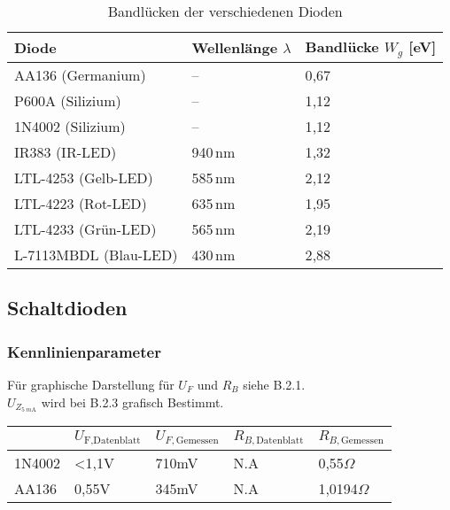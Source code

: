 \documentclass[
	a4paper, %
	12pt, %
]{CSUniSchoolLabReport}
\newcommand{\milli}{m}
\begin{document}
\begin{table}[h]
\centering
\begin{tabular}{lll}
\toprule
\textbf{Diode} & \textbf{Wellenlänge \(\lambda\)} & \textbf{Bandlücke \(W_g\) [eV]} \\
\midrule
AA136 (Germanium)     & --              & 0{,}67 \\
P600A (Silizium)      & --              & 1{,}12 \\
1N4002 (Silizium)     & --              & 1{,}12 \\
IR383 (IR-LED)        & 940\,nm         & 1{,}32 \\
LTL-4253 (Gelb-LED)   & 585\,nm         & 2{,}12 \\
LTL-4223 (Rot-LED)    & 635\,nm         & 1{,}95 \\
LTL-4233 (Grün-LED)   & 565\,nm         & 2{,}19 \\
L-7113MBDL (Blau-LED) & 430\,nm         & 2{,}88 \\
\bottomrule
\end{tabular}
\caption{Bandlücken der verschiedenen Dioden}
\end{table}


\subsection{Schaltdioden}

\subsubsection{Kennlinienparameter}
Für graphische Darstellung für $U_F$ und $R_B$ siehe B.2.1. \\
$U_{Z_{\SI{5}{\milli\ampere}}}$ wird bei B.2.3 grafisch Bestimmt. \\

\begin{table}[H]
\centering
\begin{tabular}{l|llll}
                            & $U_{\text{F,Datenblatt}}$ & $U_{F,\text{Gemessen}}$ & $R_{B,\text{Datenblatt}}$ & $R_{B,\text{Gemessen}}$ \\
\hline
1N4002                     & <1,1V                        & 710mV                      & N.A                          & 0,55$\Omega$                       \\
\hline
AA136                      & 0,55V                        & 345mV                      & N.A                          & 1,0194$\Omega$                       \\                       
\end{tabular}
\end{table}
\end{document}
